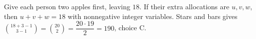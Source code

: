 Give each person two apples first, leaving $18$. If their extra allocations are $u,v,w$, then $u+v+w=18$ with nonnegative integer variables. Stars and bars gives $\binom{18+3-1}{3-1}=\binom{20}{2}=\dfrac{20\cdot 19}{2}=\boxed{190}$, choice C.
